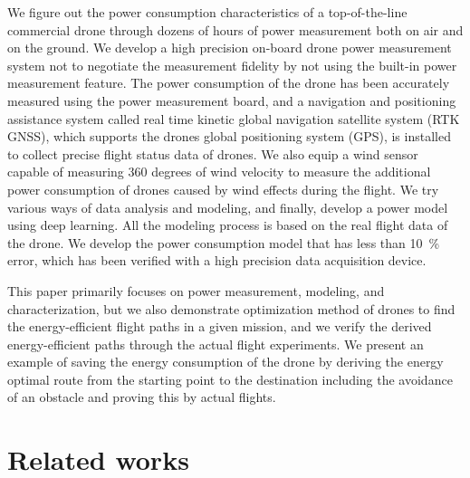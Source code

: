 \documentclass[journal]{./template/IEEEtran}
\begin{document}
We figure out the power consumption characteristics of a top-of-the-line commercial drone through dozens of hours of power measurement both on air and on the ground.
We develop a high precision on-board drone power measurement system not to negotiate the measurement fidelity by not using the built-in power measurement feature. 
The power consumption of the drone has been accurately measured using the power measurement board, and a navigation and positioning assistance system called real time kinetic global navigation satellite system (RTK GNSS), which supports the drones global positioning system (GPS), is installed to collect precise flight status data of drones.
We also equip a wind sensor capable of measuring 360 degrees of wind velocity to measure the additional power consumption of drones caused by wind effects during the flight.
We try various ways of data analysis and modeling, and finally, develop a power model using deep learning.
All the modeling process is based on the real flight data of the drone. We develop the power consumption model that has less than 10~\% error, which has been verified with a high precision data acquisition device.

This paper primarily focuses on power measurement, modeling, and characterization, but we also demonstrate optimization method of drones to find the energy-efficient flight paths in a given mission, and we verify the derived energy-efficient paths through the actual flight experiments.
We present an example of saving the energy consumption of the drone by deriving the energy optimal route from the starting point to the destination including the avoidance of an obstacle and proving this by actual flights.














\section{Related works}
\end{document}
